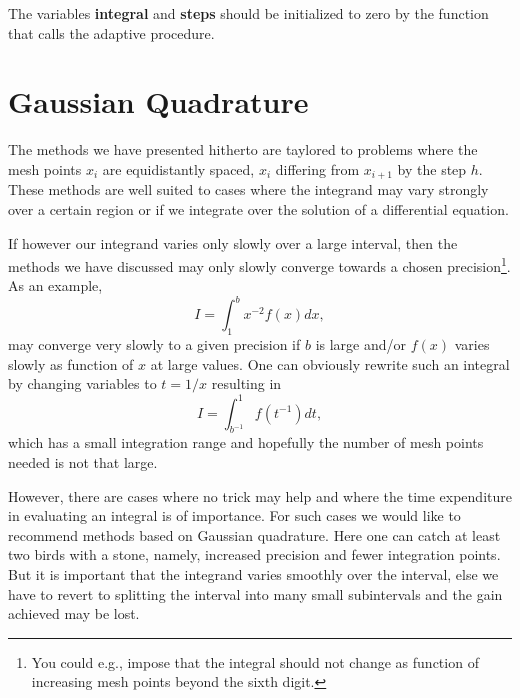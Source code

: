 The variables {\bf integral} and {\bf steps} should be initialized to zero by the function
that calls the adaptive procedure.



\section{Gaussian Quadrature}

The methods we have presented hitherto are taylored to problems where the 
mesh points $x_i$ are equidistantly spaced, $x_i$ differing from $x_{i+1}$ by the step $h$.
These methods are well suited to cases where the integrand may vary strongly over a certain
region or if we integrate over the solution of a differential equation.

If however our integrand varies only slowly over a large interval, then the methods 
we have discussed may only slowly converge towards a chosen precision\footnote{You could e.g.,
impose that the integral should not change as function of increasing mesh points
beyond the sixth digit.}. 
As an example,
\[
   I=\int_1^{b}x^{-2}f(x)dx,
\]
may converge very slowly to a given precision if $b$ is large and/or $f(x)$ varies slowly
as function of $x$ at large values. 
One can obviously rewrite such an integral by changing variables to $t=1/x$ resulting in
\[
   I=\int_{b^{-1}}^1f(t^{-1})dt,
\]
which has a small integration range and hopefully the number of mesh points needed is not that
large.

However, there are cases where no trick may help and where the time expenditure in evaluating
an integral is of importance. For such cases we would like to recommend methods
based on Gaussian quadrature. Here one can catch at least two birds with a stone, namely,
increased precision and fewer integration points. But it is important that the integrand varies
smoothly over the interval, else we have to revert to splitting the interval into many small
subintervals and the gain achieved may be lost.  %

